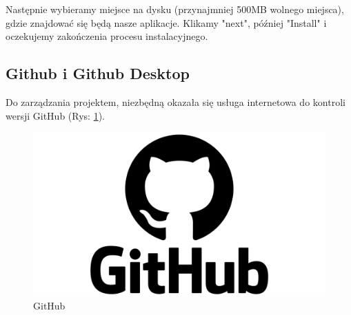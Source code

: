 Następnie wybieramy miejsce na dysku (przynajmniej 500MB wolnego miejsca), gdzie znajdować się będą nasze aplikacje. Klikamy "next", później "Install" i oczekujemy zakończenia procesu instalacyjnego.

\subsection{Github i Github Desktop}
\hspace{0.60 cm}Do zarządzania projektem, niezbędną okazała się usługa internetowa do kontroli wersji GitHub (Rys: \ref{rys:Github-icon})\cite{www3}.
\begin{figure}[!hbt]
	\begin{center}
		\includegraphics[width=\textwidth]{rys/Github.png}
		\caption{GitHub}
		\label{rys:Github-icon}
	\end{center}
\end{figure}

